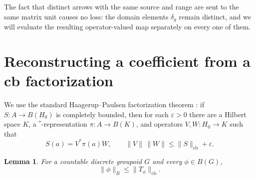 \documentclass[11pt]{article}
\newtheorem{lemma}[theorem]{Lemma}
\theoremstyle{remark}
\newcommand{\cb}{\mathrm{cb}}
\begin{document}
The fact that distinct arrows with the same source and range are sent to the
same matrix unit causes no loss: the domain elements \(\delta_g\) remain
distinct, and we will evaluate the resulting operator-valued map separately
on every one of them.

\section{Reconstructing a coefficient from a cb factorization}

We use the standard Haagerup--Paulsen factorization theorem
\cite[Ch.~8]{Paulsen}: if \(S:A\to B(H_0)\) is completely bounded, then for
each \(\varepsilon>0\) there are a Hilbert space \(K\), a
\(^{*}\)-representation \(\pi:A\to B(K)\), and operators
\(V,W:H_0\to K\) such that
\begin{equation}\label{eq:HP}
 S(a)=V^*\pi(a)W,\qquad
 \|V\|\,\|W\|\leq\|S\|_{\cb}+\varepsilon.
\end{equation}

\begin{lemma}\label{lem:reverse}
For a countable discrete groupoid \(G\) and every \(\phi\in B(G)\),
\[
 \|\phi\|_B\leq\|T_\phi\|_{\cb}.
\]
\end{lemma}
\end{document}
